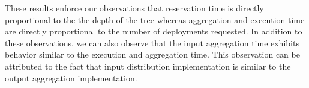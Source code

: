 These results enforce our observations that reservation time is directly
proportional to the the depth of the tree whereas aggregation and execution time
are directly proportional to the number of deployments requested.  In addition
to these observations, we can also observe that the input aggregation time exhibits 
behavior similar to the execution and aggregation time.  This observation can be
attributed to the fact that input distribution implementation is similar
to the output aggregation implementation.  

%
%

